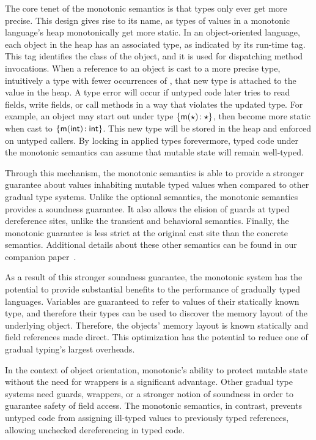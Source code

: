\documentclass[sigconf]{acmart}
\begin{document}
The core tenet  of the monotonic semantics is that types only ever get more
precise. This design gives rise to its name, as types of values in a monotonic
language's heap monotonically get more static. In an object-oriented language,
each object in the heap has an associated type, as indicated by its run-time
tag. This tag identifies the class of the object, and it is used for
dispatching method invocations. When a reference to an object is cast to a
more precise type, intuitively a type with fewer occurrences of \any, that new
type is attached to the value in the heap.  A type error will occur if untyped
code later tries to read fields, write fields, or call methods in a way that
violates the updated type. For example, an object may start out under type
$\{ {{\sf{m}}(\star)}\!:{\star}\}$, then become more static when cast to
$\{ {{\sf{m}}({\sf{int}})}\!:{{\sf{int}}}\}$. This new type will be stored in the heap
and enforced on untyped callers. By locking in applied types forevermore,
typed code under the monotonic semantics can assume that mutable state will
remain well-typed.

Through this mechanism, the monotonic semantics is able to provide a stronger
guarantee about values inhabiting mutable typed values when compared to other
gradual type systems. Unlike the optional semantics, the monotonic semantics
provides a soundness guarantee. It also allows the elision of guards at typed
dereference sites, unlike the transient and behavioral semantics. Finally,
the monotonic guarantee is less strict at the original cast site than the
concrete semantics. Additional details about these other semantics can be
found in our companion paper~\cite{us}.

As a result of this stronger soundness guarantee, the monotonic system has the
potential to provide substantial benefits to the performance of gradually
typed languages. Variables are guaranteed to refer to values of their
statically known type, and therefore their types can be used to discover the
memory layout of the underlying object.  Therefore, the objects' memory layout is
known statically and field references made direct. This optimization has the
potential to reduce one of gradual typing's largest overheads.

In the context of object orientation, monotonic's ability to protect mutable
state without the need for wrappers is a significant advantage. Other
gradual type systems need guards, wrappers, or a stronger notion of
soundness in order to guarantee safety of field access. The monotonic
semantics, in contrast, prevents untyped code from assigning ill-typed
values to previously typed references, allowing unchecked dereferencing in
typed code.
\end{document}
